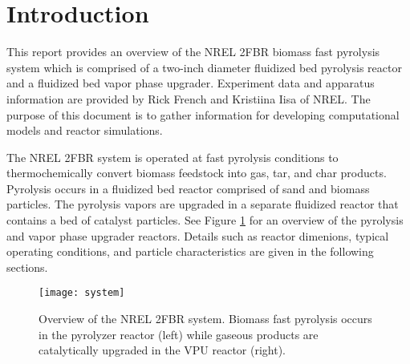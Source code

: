 
\section{Introduction}

This report provides an overview of the NREL 2FBR biomass fast pyrolysis system which is comprised of a two-inch diameter fluidized bed pyrolysis reactor and a fluidized bed vapor phase upgrader. Experiment data and apparatus information are provided by Rick French and Kristiina Iisa of NREL. The purpose of this document is to gather information for developing computational models and reactor simulations.

The NREL 2FBR system is operated at fast pyrolysis conditions to thermochemically convert biomass feedstock into gas, tar, and char products. Pyrolysis occurs in a fluidized bed reactor comprised of sand and biomass particles. The pyrolysis vapors are upgraded in a separate fluidized reactor that contains a bed of catalyst particles. See Figure \ref{fig:system} for an overview of the pyrolysis and vapor phase upgrader reactors. Details such as reactor dimenions, typical operating conditions, and particle characteristics are given in the following sections.

\begin{figure}[H]
    \centering
    \texttt{[image: system]}
    \caption{Overview of the NREL 2FBR system. Biomass fast pyrolysis occurs in the pyrolyzer reactor (left) while gaseous products are catalytically upgraded in the VPU reactor (right).}
    \label{fig:system}
\end{figure}
